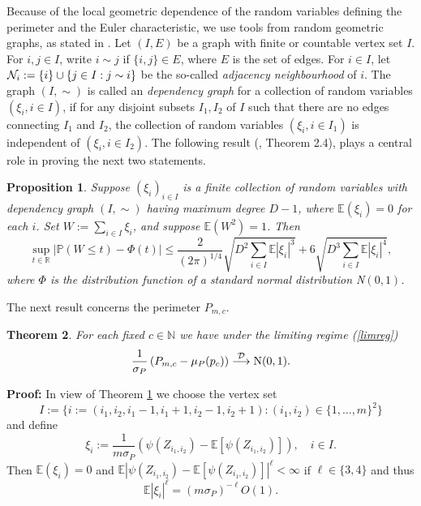 \documentclass[12pt]{article}
\def\R{\mathbb{R}}
\def\N{\mathbb{N}}
\def\BE{\mathbb{E}}
\def\cd{\stackrel{\mathcal{D}}{\longrightarrow}}
\newtheorem{theorem}{\bf{Theorem}}[section]
\newtheorem{propos}[theorem]{Proposition}
\begin{document}
Because of the local geometric dependence of the random variables defining the perimeter and the Euler characteristic, we use tools from random geometric graphs, as stated in \cite{09}.
 Let $(I,E)$ be a graph with finite or countable vertex set $I$. For $i,j \in I$, write $i \sim  j$ if $\{i,j\}\in E$, where $E$ is the set of edges.
 For $i \in I$, let ${\cal N}_i:= \{i\} \cup \{j \in I: j \sim i\}$ be the so-called {\em adjacency neighbourhood} of $i$. The graph $(I, \sim )$ is called an {\em dependency graph} for a collection of random variables $(\xi_i, i \in I)$, if for any disjoint subsets $I_1,I_2$ of $I$ such that there are no edges connecting $I_1$ and $I_2$, the collection of random variables $(\xi_i, i \in I_1)$ is independent of $(\xi_i, i \in I_2)$. The following result (\cite{09}, Theorem 2.4), plays a central role in proving the next two statements.
\begin{propos}\label{PRT}
Suppose $(\xi_i)_{i \in I}$ is a finite collection of random variables with dependency graph $(I, \sim )$ having maximum degree $D-1$, where $\BE(\xi_i) =0$ for each $i$. Set $W:= \sum_{i \in I}\xi_i$, and suppose $\BE(W^2) =1$. Then
$$
\sup_{t \in \R}|\mathbb{P}(W \le t) - \Phi(t)| \le \frac{2}{(2 \pi)^{1/4}} \sqrt{ D^2 \sum_{i \in I} \mathbb{E} |\xi_i|^3} + 6 \sqrt{D^3  \sum_{i \in I} \mathbb{E} |\xi_i|^4},
$$
where $\Phi$ is the distribution function of a standard normal distribution {\rm N}$(0,1)$.
\end{propos}
The next result concerns the perimeter $P_{m,c}$.
%
%
\begin{theorem}\label{H0P}
For each fixed $c\in\N$ we have under the limiting regime (\ref{limreg})
\begin{equation*}
\frac{1}{\sigma_P}\left(P_{m,c}-\mu_P(p_c)\right)\cd {\rm{N}}(0,1).
\end{equation*}
\end{theorem}
%
%
{\bf Proof:}
In view of Theorem \ref{PRT} we choose the vertex set
$$
I := \{i :=(i_1,i_2,i_1-1,i_1+1,i_2-1,i_2+1): (i_1,i_2) \in \{1,\ldots,m\}^2\}
$$
and define
\begin{equation}\label{gl1}
\xi_i := \frac{1}{m\sigma_P}\left(\psi(Z_{i_1,i_2})-\mathbb{E}\left[\psi(Z_{i_1,i_2})\right]\right),\quad i\in I.
\end{equation}
Then $\mathbb{E}(\xi_i)=0$ and $\mathbb{E}\left|\psi(Z_{i_1,i_2})-\mathbb{E}\left[\psi(Z_{i_1,i_2})\right]\right|^\ell<\infty$ if $\ell\in\{3,4\}$ and thus
\begin{equation*}
\mathbb{E}|\xi_i|^\ell=(m\sigma_P)^{-\ell}O(1).
\end{equation*}
\end{document}
